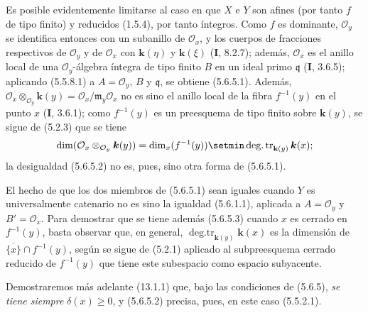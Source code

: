 Es posible evidentemente limitarse al caso en que $X$ e $Y$ son afines (por
tanto $f$ de tipo finito) y reducidos (1.5.4), por tanto íntegros. Como $f$ es
dominante, $\mathcal O_y$ se identifica entonces con un subanillo de
$\mathcal O_x$, y los cuerpos de fracciones respectivos de $\mathcal O_y$ y
de $\mathcal O_x$ con $\boldsymbol{k}(\eta)$ y $\boldsymbol{k}(\xi)$ (\textbf I, 8.2.7); además,
$\mathcal O_x$ es el anillo local de una $\mathcal O_y$-álgebra íntegra de
tipo finito $B$ en un ideal primo $\mathfrak q$ (\textbf I, 3.6.5);
aplicando
(5.5.8.1) a $A=\mathcal O_y$, $B$ y $\mathfrak q$, se obtiene (5.6.5.1).
Además,
$\mathcal O_x\otimes_{\mathcal O_y}\boldsymbol{k}(y)=\mathcal O_x/\mathfrak m_y\mathcal O_x$
no es sino el anillo local de la fibra $f^{-1}(y)$ en el punto $x$
(\textbf I, 3.6.1); como $f^{-1}(y)$ es un preesquema de tipo finito sobre $\boldsymbol{k}(y)$, se
sigue de (5.2.3) que se tiene
\[
\dim(\mathcal O_x\otimes_{\mathcal O_y}\boldsymbol{k}(y))
=\dim_x(f^{-1}(y))\setmin\operatorname{deg.tr}_{\mathbf{k}(y)}\boldsymbol{k}(x);
\]
la desigualdad (5.6.5.2) no es, pues, sino otra forma de (5.6.5.1).

El hecho de que los dos miembros de (5.6.5.1) sean iguales cuando $Y$ es
universalmente
catenario no es sino la igualdad (5.6.1.1), aplicada a
$A=\mathcal O_y$ y $B'=\mathcal O_x$. Para demostrar que se tiene además
(5.6.5.3) cuando $x$ es cerrado en $f^{-1}(y)$, basta observar que, en
general, $\operatorname{deg.tr}_{\mathbf{k}(y)}\boldsymbol{k}(x)$ es la dimensión de
$\overline{\{x\}}\cap f^{-1}(y)$, según se sigue de (5.2.1) aplicado al
subpreesquema cerrado reducido de $f^{-1}(y)$ que tiene este subespacio como
espacio subyacente.

Demostraremos más adelante (13.1.1) que, bajo las condiciones de (5.6.5), \emph{se
tiene siempre} $\delta(x)\geq0$, y (5.6.5.2) precisa, pues, en este caso (5.5.2.1).
